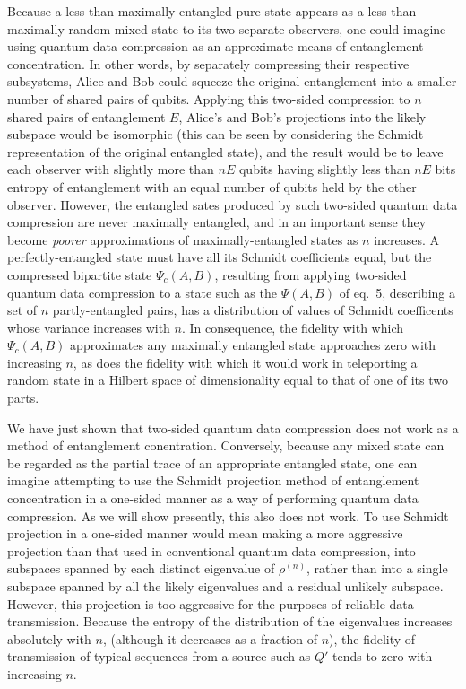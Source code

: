 Because a less-than-maximally entangled pure state appears
as a less-than-maximally random mixed state to its two separate
observers, one could imagine using quantum data compression
as an approximate means of entanglement concentration.  In other
words, by separately compressing their respective subsystems, Alice and
Bob could squeeze the original entanglement into a smaller number
of shared pairs of qubits.  Applying this two-sided compression to
$n$ shared pairs of entanglement $E$, Alice's and Bob's projections
into the likely subspace would be isomorphic (this can be seen by
considering the Schmidt representation of the original entangled
state), and the result would be to leave each observer with
slightly more than $nE$ qubits having slightly less than $nE$ bits
entropy of entanglement with an equal number of qubits held by
the other observer.  However, the entangled sates produced by such
two-sided quantum data compression are never maximally entangled, and in
an important sense they become {\sl poorer\/} approximations of
maximally-entangled states as $n$ increases.  A perfectly-entangled
state must have all its Schmidt coefficients equal, but the compressed bipartite
state $\Psi_c(A,B)$, resulting from applying two-sided quantum data compression
to a state such as the $\Psi(A,B)$ of eq.~5, describing a set of $n$
partly-entangled pairs, has
a distribution of values of Schmidt coefficents whose variance increases
with $n$.  In consequence, the fidelity with which $\Psi_c(A,B)$
approximates any maximally entangled state approaches zero with
increasing $n$, as does the fidelity with which it would work in
teleporting a random state in a Hilbert space of dimensionality equal to
that of one of its two parts.
 
 
 
We have just shown that two-sided quantum data compression does not work
as a method of entanglement conentration. Conversely, because any mixed
state can be regarded as the partial trace of an appropriate entangled
state, one can imagine attempting to use the Schmidt projection method
of entanglement concentration in a one-sided manner as a way of
performing quantum data compression.  As we will show presently, this
also does not work. To use Schmidt projection in a one-sided manner
would mean making a more aggressive projection than that used in
conventional quantum data compression, into subspaces spanned by each
distinct eigenvalue of $\rho^{(n)}$,
rather than into a single subspace spanned by all the likely eigenvalues
and a residual unlikely subspace.  However, this projection is too
aggressive for the purposes of reliable data transmission.  Because the
entropy of the distribution of the eigenvalues increases absolutely with $n$,
(although it decreases as a fraction of $n$), the fidelity of
transmission of typical sequences from a source such as $Q'$ tends to
zero with increasing $n$.
 
